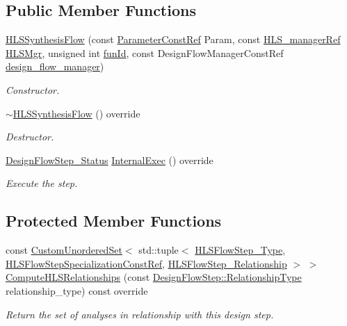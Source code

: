 \subsection*{Public Member Functions}
\begin{DoxyCompactItemize}
\item 
\hyperlink{classHLSSynthesisFlow_a1880dd0f3096c271b622fe7bf599e9a5}{H\+L\+S\+Synthesis\+Flow} (const \hyperlink{Parameter_8hpp_a37841774a6fcb479b597fdf8955eb4ea}{Parameter\+Const\+Ref} Param, const \hyperlink{hls__manager_8hpp_acd3842b8589fe52c08fc0b2fcc813bfe}{H\+L\+S\+\_\+manager\+Ref} \hyperlink{classHLS__step_ade85003a99d34134418451ddc46a18e9}{H\+L\+S\+Mgr}, unsigned int \hyperlink{classHLSFunctionStep_a3e6434fd86c698b0c70520b859bff5b0}{fun\+Id}, const Design\+Flow\+Manager\+Const\+Ref \hyperlink{classDesignFlowStep_ab770677ddf087613add30024e16a5554}{design\+\_\+flow\+\_\+manager})
\begin{DoxyCompactList}\small\item\em Constructor. \end{DoxyCompactList}\item 
\hyperlink{classHLSSynthesisFlow_aec8618aa2e94de76c061ef9c62311548}{$\sim$\+H\+L\+S\+Synthesis\+Flow} () override
\begin{DoxyCompactList}\small\item\em Destructor. \end{DoxyCompactList}\item 
\hyperlink{design__flow__step_8hpp_afb1f0d73069c26076b8d31dbc8ebecdf}{Design\+Flow\+Step\+\_\+\+Status} \hyperlink{classHLSSynthesisFlow_acb5919ff1945e5bf341f9df0d301538b}{Internal\+Exec} () override
\begin{DoxyCompactList}\small\item\em Execute the step. \end{DoxyCompactList}\end{DoxyCompactItemize}
\subsection*{Protected Member Functions}
\begin{DoxyCompactItemize}
\item 
const \hyperlink{classCustomUnorderedSet}{Custom\+Unordered\+Set}$<$ std\+::tuple$<$ \hyperlink{hls__step_8hpp_ada16bc22905016180e26fc7e39537f8d}{H\+L\+S\+Flow\+Step\+\_\+\+Type}, \hyperlink{hls__step_8hpp_a5fdd2edf290c196531d21d68e13f0e74}{H\+L\+S\+Flow\+Step\+Specialization\+Const\+Ref}, \hyperlink{hls__step_8hpp_a3ad360b9b11e6bf0683d5562a0ceb169}{H\+L\+S\+Flow\+Step\+\_\+\+Relationship} $>$ $>$ \hyperlink{classHLSSynthesisFlow_ab50e0c7e5ddf4bc0e977f2fb2d1b3d21}{Compute\+H\+L\+S\+Relationships} (const \hyperlink{classDesignFlowStep_a723a3baf19ff2ceb77bc13e099d0b1b7}{Design\+Flow\+Step\+::\+Relationship\+Type} relationship\+\_\+type) const override
\begin{DoxyCompactList}\small\item\em Return the set of analyses in relationship with this design step. \end{DoxyCompactList}\end{DoxyCompactItemize}
